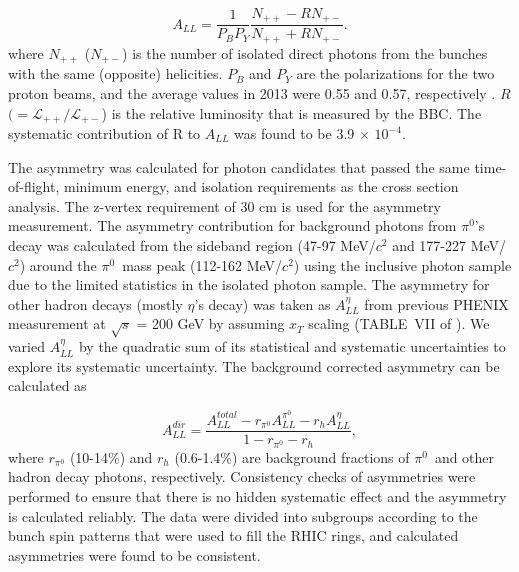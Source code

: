 \documentclass[twocolumn,letterpaper,aps,prl,longbibliography,superscriptaddress,floatfix]{revtex4-2}
\newcommand{\pizero}{\ensuremath{\pi^0}}
\newcommand{\ALL}{\ensuremath{A_{LL}}}
\begin{document}
\begin{equation}
A_{LL} = \frac{1}{P_BP_Y} \frac{N_{++}-RN_{+-}}{N_{++}+RN_{+-}}.
\end{equation}
where $N_{++}$ ($N_{+-}$) is the number of isolated direct photons from the bunches with the same (opposite) helicities. $P_{B}$ and $P_{Y}$ are the polarizations for the two proton beams, and the average values in 2013 were 0.55 and 0.57, respectively \cite{POBLAGUEV2020164261}. $R$ $(= \mathcal{L_{++}}/\mathcal{L_{+-}}$) is the relative luminosity that is measured by the BBC. The systematic contribution of R to $A_{LL}$ was found to be 3.9 $\times$ $10^{-4}$.

The asymmetry was calculated for photon candidates that passed the same time-of-flight, minimum energy, and isolation requirements as the cross section analysis. The z-vertex requirement of 30 cm is used for the asymmetry measurement. The asymmetry contribution for background photons from \pizero's decay was calculated from the sideband region (47-97 MeV/$c^2$ and 177-227 MeV/$c^2$) around the \pizero\ mass peak (112-162 MeV/$c^2$) using the inclusive photon sample due to the limited statistics in the isolated photon sample. The asymmetry for other hadron decays (mostly $\eta$'s decay) was taken as $A_{LL}^{\eta}$ from previous PHENIX measurement at $\sqrt{s}$ = 200 GeV by assuming $x_T$ scaling (TABLE~VII of \cite{PhysRevD.90.012007}). We varied $A_{LL}^{\eta}$ by the quadratic sum of its statistical and systematic uncertainties to explore its systematic uncertainty. The background corrected asymmetry can be calculated as

\begin{equation} \label{eq:all-dir}
A_{LL}^{dir} = \frac{A_{LL}^{total} - r_{\pi^0}A_{LL}^{\pi^0} -r_h A_{LL}^{\eta}}{1 - r_{\pi^0} - r_h},
\end{equation}
where $r_{\pi^0}$ (10-14\%) and $r_h$ (0.6-1.4\%) are background fractions of \pizero\ and other hadron decay photons, respectively. Consistency checks of asymmetries were performed to ensure that there is no hidden systematic effect and the asymmetry is calculated reliably. The data were divided into subgroups according to the bunch spin patterns that were used to fill the RHIC rings, and calculated asymmetries were found to be consistent.

\end{document}

